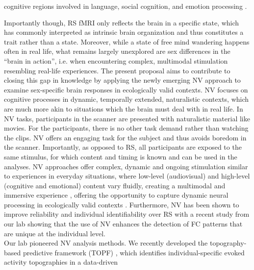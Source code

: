 \documentclass[11pt,a4paper]{article}
\begin{document}
cognitive regions involved in language, social cognition, and emotion processing 
\parencite{weisSexClassificationResting2020a,wierschAccurateSexPrediction2023a,wierschSexDifferencesBrain2021a}.
\par\vspace{-1\parskip}\noindent
Importantly though, RS fMRI only reflects the brain in a specific state, which has commonly interpreted as 
intrinsic brain organization and thus constitutes a trait rather than a state. Moreover, while a state of free mind wandering happens often in real life, what remains largely unexplored are sex differences in the “brain in action”, i.e. when encountering complex, multimodal stimulation resembling real-life experiences.
The present proposal aims to contribute to closing this gap in knowledge by applying the newly 
emerging NV approach to examine sex-specific brain responses in ecologically valid contexts. NV focuses on 
cognitive processes in dynamic, temporally extended, naturalistic contexts, which are much more akin to
situations which the brain must deal with in real life. In NV tasks, participants in the scanner are 
presented with naturalistic material like movies. For the participants, there is no other task demand rather 
than watching the clips. NV offers an engaging task for the subject and thus avoids boredom in the scanner. 
Importantly, as opposed to RS, all participants are exposed to the same stimulus, for which content and timing 
is known and can be used in the analyses. NV approaches offer complex, dynamic and ongoing stimulation similar 
to experiences in everyday situations, where low-level (audiovisual) and high-level (cognitive and emotional) 
content vary fluidly, creating a multimodal and immersive experience \parencite{sonkusareNaturalisticStimuliNeuroscience2019}, offering the 
opportunity to capture dynamic neural processing in ecologically valid contexts \parencite{vanderwalMoviesMagnetNaturalistic2019}. 
Furthermore, NV has been shown to improve reliability and individual identifiability over RS \parencite{krollNaturalisticViewingIncreases2023} 
with a recent study from our lab \parencite{krollNaturalisticViewingIncreases2023} showing that the use of NV enhances the detection of 
FC patterns that are unique at the individual level.\\ 
Our lab pioneered NV analysis methods. We recently developed the topography-based predictive framework 
(TOPF) \parencite{liTopographybasedPredictiveFramework2023a}, which identifies individual-specific evoked activity topographies in a data-driven 
\end{document}

